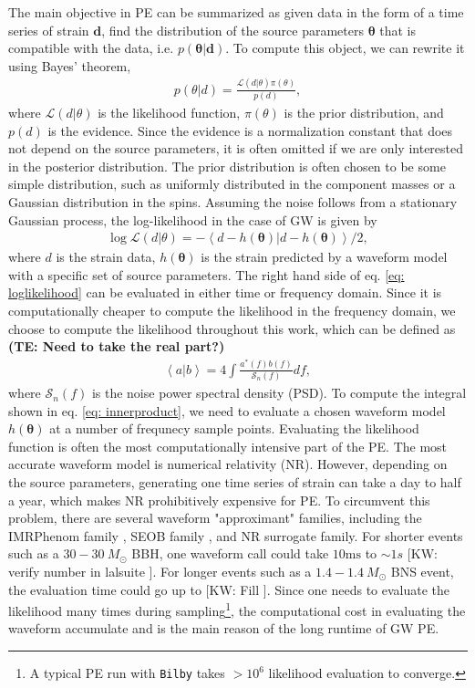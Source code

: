 \documentclass[twocolumn]{aastex631}
\newcommand{\kw}[1]{{\color{rb4}[KW: #1 ]}}
\newcommand{\te}[1]{\textbf{\color{pyRed}(TE: #1)}}
\begin{document}
The main objective in PE can be summarized as given data in the form of a time
series of strain $\mathbf{d}$, find the distribution of the source parameters
$\mathbf{\theta}$ that is compatible with the data, i.e.
$p(\mathbf{\theta}|\mathbf{d})$. To compute this object, we can rewrite
it using Bayes' theorem,
\begin{align}
    p(\theta| d) = \frac{\mathcal{L}(d|\theta)\pi(\theta)}{p(d)},
\end{align}
where $\mathcal{L}(d|\theta)$ is the likelihood function, $\pi(\theta)$ is the
prior distribution, and $p(d)$ is the evidence. Since the evidence is a
normalization constant that does not depend on the source parameters, it is
often omitted if we are only interested in the posterior distribution. The prior
distribution is often chosen to be some simple distribution, such as uniformly
distributed in the component masses or a Gaussian distribution in the spins.
Assuming the noise follows from a stationary Gaussian process, the
log-likelihood in the case of GW is given by
\begin{align}
    \log{\mathcal{L}(d|\theta)} = -\left<d-h(\mathbf{\theta})|d-h(\mathbf{\theta})\right>/2,
\label{eq: loglikelihood}
\end{align}
where $d$ is the strain data, $h(\mathbf{\theta})$ is the strain predicted by a
waveform model with a specific set of source parameters. The right hand side of
eq. \ref{eq: loglikelihood} can be evaluated in either time or frequency domain.
Since it is computationally cheaper to compute the likelihood in the frequency
domain, we choose to compute the likelihood throughout this work, which can be defined as 
\te{Need to take the real part?}
\begin{align}
    \left<a|b\right> = 4 \int \frac{a^*(f)b(f)}{\mathcal{S}_n(f)} df,
\label{eq: innerproduct}
\end{align}
where $\mathcal{S}_n(f)$ is the noise power spectral density (PSD). To compute
the integral shown in eq. \ref{eq: innerproduct}, we need to evaluate a chosen
waveform model $h(\mathbf{\theta})$ at a number of frequnecy sample points.
Evaluating the likelihood function is often the most computationally intensive
part of the PE. The most accurate waveform model is numerical relativity (NR).
However, depending on the source parameters, generating one time series of
strain can take a day to half a year, which makes NR prohibitively expensive for
PE. To circumvent this problem, there are several waveform "approximant"
families, including the IMRPhenom family \cite{Khan:2015jqa,
Garcia-Quiros:2020qpx}, SEOB family \cite{PhysRevD.89.061502}, and NR surrogate
family\cite{Varma:2019csw}. For shorter events such as a $30-30\ M_{\odot}$ BBH, one
waveform call could take $10\text{ms}$ to $\sim 1s$ \kw{verify number in
lalsuite}. For longer events such as a $1.4-1.4\ M_{\odot}$ BNS event, the
evaluation time could go up to \kw{Fill}. Since one needs to evaluate the
likelihood many times during sampling\footnote{A typical PE run with
\texttt{Bilby} takes $>10^6$ likelihood evaluation to converge.}, the
computational cost in evaluating the waveform accumulate and is the main reason
of the long runtime of GW PE.
\end{document}
